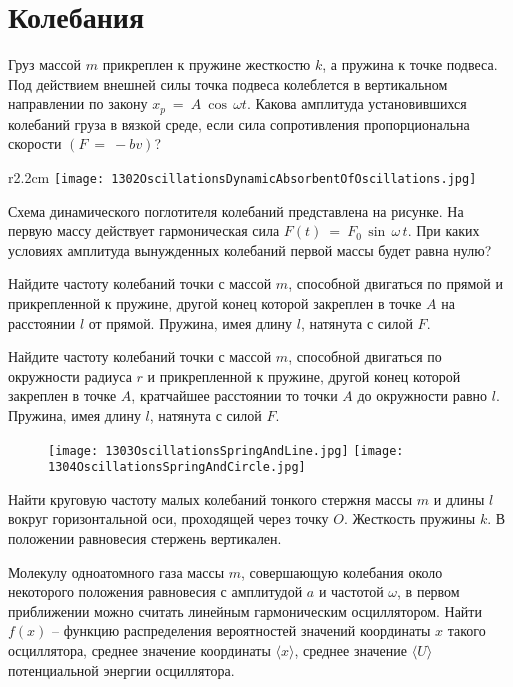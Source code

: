 \section{Колебания}

\AddProb Груз массой $m$ прикреплен к пружине жесткостю $k$, а пружина к точке подвеса. 
Под действием внешней силы точка подвеса колеблется в вертикальном направлении по закону $x_p~=~A~\cos\,\omega t$. 
Какова амплитуда установившихся колебаний груза в вязкой среде, если сила сопротивления пропорциональна скорости $(F~=~-bv)$?

\begin{wrapfigure}{r}{2.2cm}
\texttt{[image: 1302OscillationsDynamicAbsorbentOfOscillations.jpg]}
\end{wrapfigure}

\AddProb Схема динамического поглотителя колебаний представлена на рисунке. На первую массу действует гармоническая сила $F(t)~=~F_0\,\sin\,\omega\,t$. 
При каких условиях амплитуда вынужденных колебаний первой массы будет равна нулю?

\AddProb Найдите частоту колебаний точки с массой $m$, способной двигаться по прямой и прикрепленной к пружине, 
другой конец которой закреплен в точке $A$ на расстоянии $l$ от прямой. Пружина, имея длину $l$, натянута с силой $F$.

\AddProb Найдите частоту колебаний точки с массой $m$, способной двигаться по окружности радиуса $r$ и прикрепленной к пружине, другой конец которой закреплен в точке $A$, кратчайшее расстоянии то точки $A$ до окружности равно $l$. Пружина, имея длину $l$, натянута с силой $F$.

\begin{figure}[!h]
\texttt{[image: 1303OscillationsSpringAndLine.jpg]}
\texttt{[image: 1304OscillationsSpringAndCircle.jpg]}
\end{figure}

\AddProb Найти круговую частоту малых колебаний тонкого стержня массы $m$ и длины $l$ вокруг горизонтальной оси, проходящей через точку $O$. 
Жесткость пружины $k$. В положении равновесия стержень вертикален.

\AddProb Молекулу одноатомного газа массы $m$, совершающую колебания около некоторого положения равновесия с амплитудой $a$ и частотой $\omega$, 
в первом приближении можно считать линейным гармоническим осциллятором. 
Найти $f(x)$ -- функцию распределения вероятностей значений координаты $x$ такого осциллятора, среднее значение координаты $\langle x \rangle$, 
среднее значение $\langle U \rangle$ потенциальной энергии осциллятора.

